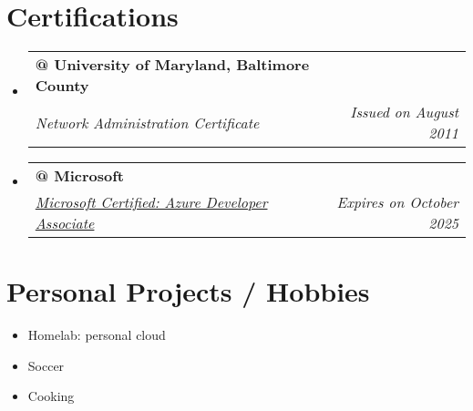 \documentclass[letterpaper,11pt]{article}
\makeatletter
\newcommand{\resumeItem}[1]{%
  \item\small{
    #1
  }
}
\newcommand{\resumeSubheading}[4]{
  \vspace{8pt}\item%
    \begin{tabular*}{0.97\textwidth}[t]{l@{\extracolsep{\fill}}r}
      \textbf{#1} & #2 \\
      \textit{\small#3} & \textit{\small #4} \\
    \end{tabular*}\vspace{-5pt}
}
\newcommand{\resumeSubItem}[2]{\resumeItem{#1}{#2}\vspace{-4pt}}
\newcommand{\resumeSubHeadingListStart}{\begin{itemize}[leftmargin=*]}
\newcommand{\resumeSubHeadingListEnd}{\end{itemize}}
\makeatother
\begin{document}
\section{Certifications}
  \resumeSubHeadingListStart
  \resumeSubheading
      {@ University of Maryland, Baltimore County}{}
      {Network Administration Certificate}{Issued on August 2011}
    \resumeSubheading
      {@ Microsoft}{}
      {\href{https://learn.microsoft.com/api/credentials/share/en-us/AbelM-7089/2CD8D55E67CA05CE?sharingId=1EAA6EDBC20E2089}{Microsoft Certified: Azure Developer Associate}}{Expires on October 2025}
  \resumeSubHeadingListEnd

\vspace{1em}
\section{Personal Projects / Hobbies}

  \resumeSubHeadingListStart
    \resumeSubItem{Homelab: personal cloud} \\
    \resumeSubItem{Soccer} \\
    \resumeSubItem{Cooking} \\
  \resumeSubHeadingListEnd

\vspace{1em}
\end{document}
